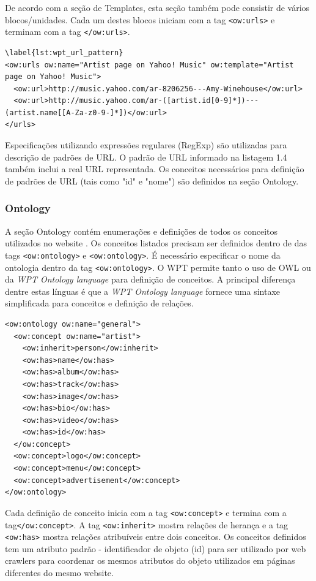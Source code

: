 De acordo com a seção de Templates, esta seção também pode consistir de vários blocos/unidades. Cada um destes blocos iniciam com a tag \texttt{<ow:urls>} e terminam com a tag \texttt{</ow:urls>}.


\begin{lstlisting}
\label{lst:wpt_url_pattern}
<ow:urls ow:name="Artist page on Yahoo! Music" ow:template="Artist page on Yahoo! Music">
  <ow:url>http://music.yahoo.com/ar-8206256---Amy-Winehouse</ow:url>
  <ow:url>http://music.yahoo.com/ar-([artist.id[0-9]*])---(artist.name[[A-Za-z0-9-]*])</ow:url>
</urls>
\end{lstlisting}

Especificações utilizando expressões regulares (RegExp) são utilizadas para descrição de padrões de URL. O padrão de URL informado na listagem 1.4 também inclui a real URL representada. Os conceitos necessários para definição de padrões de URL (tais como "id" e "nome") são definidos na seção Ontology.

\subsubsection{Ontology}

A seção Ontology contém enumerações e definições de todos os conceitos utilizados no website \cite{wpt}. Os conceitos listados precisam ser definidos dentro de das tags \texttt{<ow:ontology>} e \texttt{<ow:ontology>}. É necessário especificar o nome da ontologia dentro da tag \texttt{<ow:ontology>}. O WPT permite tanto o uso de OWL ou da \emph{WPT Ontology language} para definição de conceitos. A principal diferença dentre estas línguas é que a \emph{WPT Ontology language} fornece uma sintaxe simplificada para conceitos e definição de relações.

\begin{lstlisting}
<ow:ontology ow:name="general">
  <ow:concept ow:name="artist">
    <ow:inherit>person</ow:inherit>
    <ow:has>name</ow:has>
    <ow:has>album</ow:has>
    <ow:has>track</ow:has>
    <ow:has>image</ow:has>
    <ow:has>bio</ow:has>
    <ow:has>video</ow:has>
    <ow:has>id</ow:has>
  </ow:concept>
  <ow:concept>logo</ow:concept>
  <ow:concept>menu</ow:concept>
  <ow:concept>advertisement</ow:concept>
</ow:ontology>
\end{lstlisting}

Cada definição de conceito inicia com a tag \texttt{<ow:concept>} e termina com a tag\texttt{</ow:concept>}. A tag \texttt{<ow:inherit>} mostra relações de herança e a tag \texttt{<ow:has>} mostra relações atribuíveis entre dois conceitos. Os conceitos definidos tem um atributo padrão - identificador de objeto (id) para ser utilizado por web crawlers para coordenar os mesmos atributos do objeto utilizados em páginas diferentes do mesmo website.
